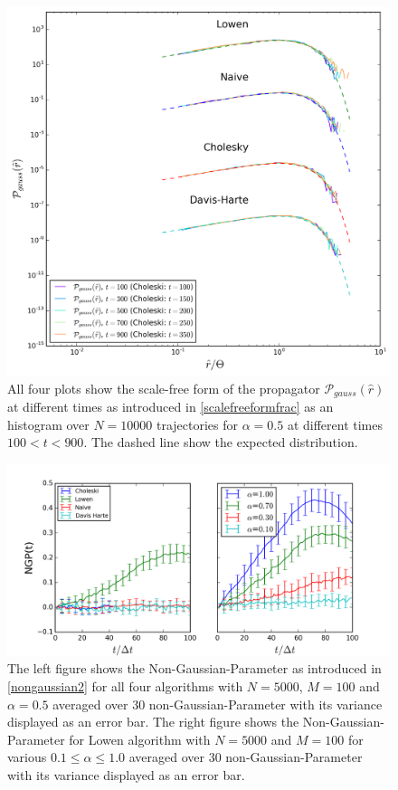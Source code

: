 \documentclass[
  a4paper,BCOR10mm,twoside,
  headsepline,footsepline,%
  fleqn,openbib
]{scrbook}
\begin{document}
\begin{figure}[h!]
\centering
\includegraphics[width=\textwidth]{./data/scaledfunctionneu12.png}
\caption{All four plots show the scale-free form of the propagator $\mathcal{P}_{gauss}(\hat{r})$ at different times as introduced in \cref{scalefreeformfrac} as an histogram over $N=10000$ trajectories for $\alpha=0.5$ at different times $100<t<900$. The dashed line show the expected distribution.}
\label{rescaledfunction}
\end{figure}
\begin{figure}[h]
\centering
\includegraphics[width=\textwidth]{./data/nongaussianlowenalphaneu.png}
\caption{ The left figure shows the Non-Gaussian-Parameter as introduced in \cref{nongaussian2} for all four algorithms with  $N=5000$, $M=100$ and $\alpha=0.5$   averaged over $30$ non-Gaussian-Parameter with its variance displayed as an error bar.\newline
The right figure shows the Non-Gaussian-Parameter for Lowen algorithm with  $N=5000$ and $M=100$ for various $0.1\leq\alpha\leq1.0$ averaged over $30$ non-Gaussian-Parameter with its variance displayed as an error bar.}
\label{nongaussianlowen}
\end{figure}
\end{document}
